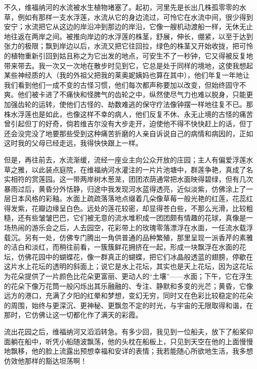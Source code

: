 \par 不久，维福纳河的水流被水生植物堵塞了。起初，河里先是长出几株孤零零的水草，例如有那样一支水浮莲，水流从它的身边流过，可怜它在水流中间，很少得到安宁；水流把它从这边的岸沿冲到那边的岸沿，它像一艘机动渡船一样，无休无止地往返在两岸之间。被推向岸边的水浮莲的株茎，舒展，伸长，绷紧，以至于达到张力的极限；飘到岸边以后，水流又把它往回拉，绿色的株茎又开始收拢，把可怜的植物重新引回到姑且称之为它出发的地点，可安生不了一秒钟，它又得被反复地带来带去。我一次又一次地在散步时见到它，它总是处于同样的境地，这使我想起某些神经质的人（我的外祖父把我的莱奥妮姨妈也算在其中），他们年复一年地让我们看到他们一成不变的古怪习惯，他们每次都声称要加以改变，但始终固守不爽。他们被卡进了不痛快和怪脾气的齿轮之中，纵然使尽气力也难以脱身，只能更加强齿轮的运转，使他们古怪的、劫数难逃的保守疗法像钟摆一样地往复不已。那株水浮莲也是如此，也像这样不幸的病人，他们反复不休、永无止境的古怪的痛苦曾引起但丁的好奇，倘若维吉尔没有大步走开，迫使他不得不快快赶上的话，但丁还会没完没了地要那些受到这种痛苦折磨的人亲自诉说自己的病情和病因的，正如这时我的父母已经走远，我得快快跟上一样。
\par 但是，再往前去，水流渐缓，流经一座业主向公众开放的庄园；主人有偏爱浮莲水草之雅，以此装点庭院，在维福纳河水灌注的一片片池塘中，群莲争艳，真成了名实相符的赏莲园。这一带两岸树木葱茏，团团浓荫通常把水面映得碧绿，但有几次暴雨过后，黄昏分外恬静，归途中我发现河水蓝得透亮，近似淡紫，仿佛涂上了一层日本风格的彩釉。水面上疏疏落落地点缀着几朵像草莓一般光艳的红莲，花蕊红得发紫，花瓣边缘呈白色。远处的莲花较密，却显得苍白些，不那么光滑，比较粗糙，还有些皱皱巴巴，它们被无意的流水堆积成一团团颇有情趣的花球，真像是一场热闹的游乐会之后，人去园空，花彩带上的玫瑰零落漂浮在水面，一任流水载浮载沉。另有一处，仿佛专门腾出一角供普通的品种繁殖，那里呈现一派香芹的素雅的洁白和淡红，而稍往前看，一簇簇鲜花拥挤在一起，形成一块飘浮在水面的花坛，仿佛花园中的蝴蝶花，像一群真正的蝴蝶，把它们冰晶般透蓝的翅膀，停歇在这片水上花坛的透明的斜面上；说它是水上花坛，其实也是天上花坛，因为这花坛为花朵提供了一片颜色比花朵更富丽、更动人的“土壤”——水面；下午，它在浮生的花朵下像万花筒一般闪烁出其乐融融的、专注、静默和多变的光芒；黄昏，它像远方的港口，充满了夕阳的红晕和梦想，变幻无穷，同时又在色彩比较稳定的花朵的周围，始终与更深沉、更神秘、更飘忽不定的时光，与宇宙的无限取得和谐，在那时，它仿佛让这一切都化作了满天的彩霞。
\par 流出花园之后，维福纳河又滔滔转急。有多少回，我见到一位船夫，放下了船桨仰面躺在船中，听凭小船随波飘荡，他的头枕在船板上，只见到天空在他的上面慢慢地飘移，他的脸上流露出预想幸福和安详的表情；我若能随心所欲地生活，我多想仿效他那样的豁达坦荡啊！
